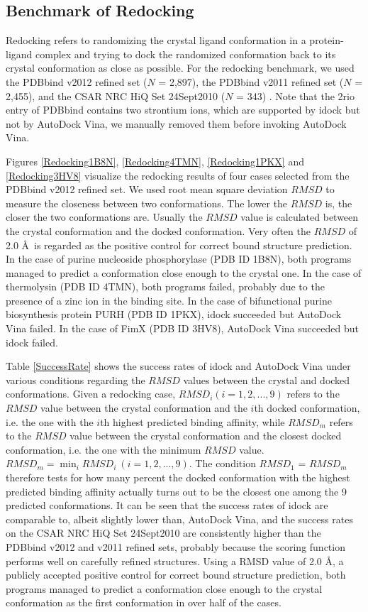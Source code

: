 \documentclass[10pt]{article}
\begin{document}
\subsection*{Benchmark of Redocking}
Redocking refers to randomizing the crystal ligand conformation in a protein-ligand complex and trying to dock the randomized conformation back to its crystal conformation as close as possible. For the redocking benchmark, we used the PDBbind v2012 \cite{529,530} refined set ($N$ = 2,897), the PDBbind v2011 refined set ($N$ = 2,455), and the CSAR NRC HiQ Set 24Sept2010 ($N$ = 343) \cite{857,960}. Note that the 2rio entry of PDBbind contains two strontium ions, which are supported by idock but not by AutoDock Vina, we manually removed them before invoking AutoDock Vina.

Figures \ref{Redocking1B8N}, \ref{Redocking4TMN}, \ref{Redocking1PKX} and \ref{Redocking3HV8} visualize the redocking results of four cases selected from the PDBbind v2012 refined set. We used root mean square deviation $RMSD$ to measure the closeness between two conformations. The lower the $RMSD$ is, the closer the two conformations are. Usually the $RMSD$ value is calculated between the crystal conformation and the docked conformation. Very often the $RMSD$ of 2.0 \AA\ is regarded as the positive control for correct bound structure prediction. In the case of purine nucleoside phosphorylase (PDB ID 1B8N), both programs managed to predict a conformation close enough to the crystal one. In the case of thermolysin (PDB ID 4TMN), both programs failed, probably due to the presence of a zinc ion in the binding site. In the case of bifunctional purine biosynthesis protein PURH (PDB ID 1PKX), idock succeeded but AutoDock Vina failed. In the case of FimX (PDB ID 3HV8), AutoDock Vina succeeded but idock failed.

Table \ref{SuccessRate} shows the success rates of idock and AutoDock Vina under various conditions regarding the $RMSD$ values between the crystal and docked conformations. Given a redocking case, $RMSD_i (i = 1,2,...,9)$ refers to the $RMSD$ value between the crystal conformation and the $i$th docked conformation, i.e. the one with the $i$th highest predicted binding affinity, while $RMSD_m$ refers to the $RMSD$ value between the crystal conformation and the closest docked conformation, i.e. the one with the minimum $RMSD$ value. $RMSD_m = \displaystyle\min_{i}RMSD_i\ (i = 1,2,...,9)$. The condition $RMSD_1$ = $RMSD_m$ therefore tests for how many percent the docked conformation with the highest predicted binding affinity actually turns out to be the closest one among the 9 predicted conformations. It can be seen that the success rates of idock are comparable to, albeit slightly lower than, AutoDock Vina, and the success rates on the CSAR NRC HiQ Set 24Sept2010 are consistently higher than the PDBbind v2012 and v2011 refined sets, probably because the scoring function performs well on carefully refined structures. Using a RMSD value of 2.0 \AA, a publicly accepted positive control for correct bound structure prediction, both programs managed to predict a conformation close enough to the crystal conformation as the first conformation in over half of the cases.
\end{document}

